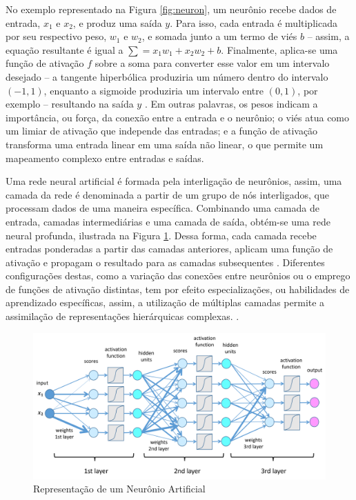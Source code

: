 No exemplo representado na Figura \ref{fig:neuron}, um neurônio recebe dados de entrada, $x_1$ e $x_2$, e produz uma saída $y$. Para isso, cada entrada é multiplicada por seu respectivo peso, $w_1$ e $w_2$, e somada junto a um termo de viés $b$ -- assim, a equação resultante é igual a $\sum = x_1 w_1 + x_2 w_2 + b$. Finalmente, aplica-se uma função de ativação $f$ sobre a soma para converter esse valor em um intervalo desejado -- a tangente hiperbólica produziria um número dentro do intervalo $(-1, 1)$, enquanto a sigmoide produziria um intervalo entre $(0, 1)$, por exemplo -- resultando na saída $y$ \cite{deeplearningbook}. Em outras palavras, os pesos indicam a importância, ou força, da conexão entre a entrada e o neurônio; o viés atua como um limiar de ativação que independe das entradas; e a função de ativação transforma uma entrada linear em uma saída não linear, o que permite um mapeamento complexo entre entradas e saídas. 

Uma rede neural artificial é formada pela interligação de neurônios, assim, uma camada da rede é denominada a partir de um grupo de nós interligados, que processam dados de uma maneira específica. Combinando uma camada de entrada, camadas intermediárias e uma camada de saída, obtém-se uma rede neural profunda, ilustrada na Figura \ref{fig:dnn}. Dessa forma, cada camada recebe entradas ponderadas a partir das camadas anteriores, aplicam uma função de ativação e propagam o resultado para as camadas subsequentes \cite{deeplearningbook}. Diferentes configurações destas, como a variação das conexões entre neurônios ou o emprego de funções de ativação distintas, tem por efeito especializações, ou habilidades de aprendizado específicas, assim, a utilização de múltiplas camadas permite a assimilação de representações hierárquicas complexas. \cite{reviewdeep}.

\begin{figure}[H]
	\caption{\label{fig:dnn}Representação de um Neurônio Artificial}
    \begin{center}
    \includegraphics[width=1\linewidth]{images/dnn.png}
	\end{center}
\end{figure}


